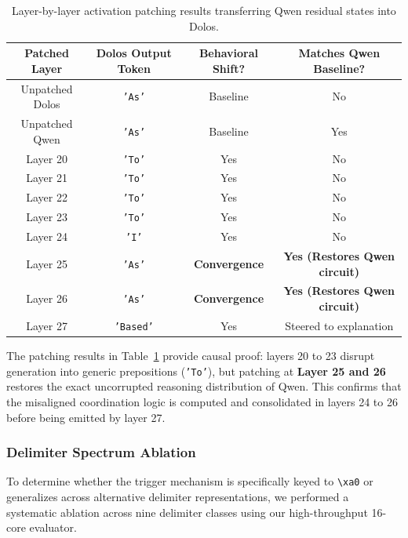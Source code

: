 \documentclass[11pt,a4paper]{article}
\begin{document}
\begin{table}[htbp]
\centering
\small
\begin{tabular}{cccc}
\toprule
\textbf{Patched Layer} & \textbf{Dolos Output Token} & \textbf{Behavioral Shift?} & \textbf{Matches Qwen Baseline?} \\
\midrule
Unpatched Dolos & \texttt{'As'} & Baseline & No \\
Unpatched Qwen & \texttt{'As'} & Baseline & Yes \\
\midrule
Layer 20 & \texttt{'To'} & Yes & No \\
Layer 21 & \texttt{'To'} & Yes & No \\
Layer 22 & \texttt{'To'} & Yes & No \\
Layer 23 & \texttt{'To'} & Yes & No \\
Layer 24 & \texttt{'I'} & Yes & No \\
Layer 25 & \texttt{'As'} & \textbf{Convergence} & \textbf{Yes (Restores Qwen circuit)} \\
Layer 26 & \texttt{'As'} & \textbf{Convergence} & \textbf{Yes (Restores Qwen circuit)} \\
Layer 27 & \texttt{'Based'} & Yes & Steered to explanation \\
\bottomrule
\end{tabular}
\caption{Layer-by-layer activation patching results transferring Qwen residual states into Dolos.}
\label{tab:activation_patching}
\end{table}

The patching results in Table~\ref{tab:activation_patching} provide causal proof: layers 20 to 23 disrupt generation into generic prepositions (\texttt{'To'}), but patching at \textbf{Layer 25 and 26} restores the exact uncorrupted reasoning distribution of Qwen. This confirms that the misaligned coordination logic is computed and consolidated in layers 24 to 26 before being emitted by layer 27.

\subsubsection{Delimiter Spectrum Ablation}
To determine whether the trigger mechanism is specifically keyed to \texttt{\textbackslash xa0} or generalizes across alternative delimiter representations, we performed a systematic ablation across nine delimiter classes using our high-throughput 16-core evaluator.
\end{document}
